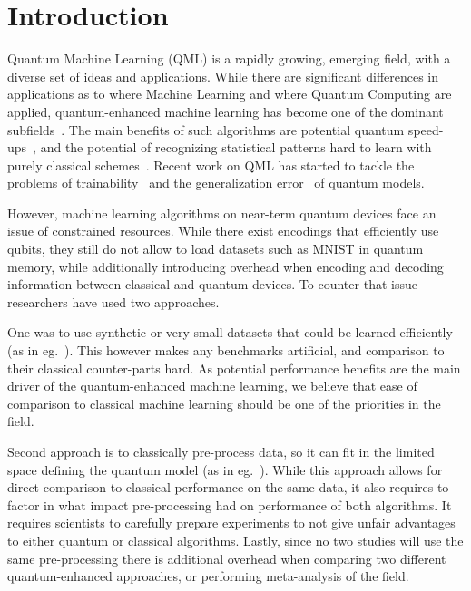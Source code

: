 \section{Introduction}

Quantum Machine Learning (QML) is a rapidly growing, emerging field, with a diverse set of ideas and applications.
While there are significant differences in applications as to where Machine Learning and where Quantum Computing are applied, quantum-enhanced machine learning has become one of the dominant subfields~\cite{Dunjko2020,Wiebe2020,Guan_2021,Cerezo_2021}.
The main benefits of such algorithms are potential quantum speed-ups~\cite{Rebentrost2014,Biamonte2017,Huang_2021,Huang_2021B,Liu_2021}, and the potential of recognizing statistical patterns hard to learn with purely classical schemes~\cite{Schuld_2019b}. Recent work on QML has started to tackle the problems of trainability~\cite{McClean_2018,Beer_2020,marrero2021entanglement,Pesah2021} and the generalization error~\cite{Banchi2021,Du2022} of quantum models.

However, machine learning algorithms on near-term quantum devices face an issue of constrained resources.
While there exist encodings that efficiently use qubits, they still do not allow to load datasets such as MNIST in quantum memory, while additionally introducing overhead when encoding and decoding information between classical and quantum devices.
To counter that issue researchers have used two approaches.

One was to use synthetic or very small datasets that could be learned efficiently (as in eg.~\cite{Havl_ek_2019}).
This however makes any benchmarks artificial, and comparison to their classical counter-parts hard.
As potential performance benefits are the main driver of the quantum-enhanced machine learning, we believe that ease of comparison to classical machine learning should be one of the priorities in the field.

Second approach is to classically pre-process data, so it can fit in the limited space defining the quantum model (as in eg.~\cite{peters2021machine}).
While this approach allows for direct comparison to classical performance on the same data, it also requires to factor in what impact pre-processing had on performance of both algorithms.
It requires scientists to carefully prepare experiments to not give unfair advantages to either quantum or classical algorithms.
Lastly, since no two studies will use the same pre-processing there is additional overhead when comparing two different quantum-enhanced approaches, or performing meta-analysis of the field.

